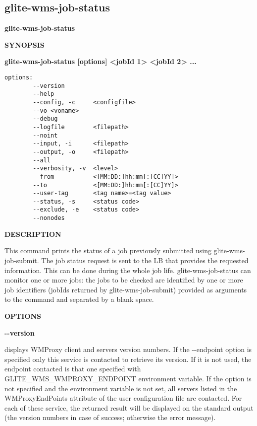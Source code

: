 
\subsection{glite-wms-job-status}
\label{glite-wms-job-status}

\medskip
\textbf{glite-wms-job-status}
\smallskip


\textbf{SYNOPSIS}
\smallskip

\textbf{glite-wms-job-status [options] <jobId 1> <jobId 2> ...}

\begin{verbatim}
options:
        --version
        --help
        --config, -c     <configfile>
        --vo <voname>
        --debug
        --logfile        <filepath>
        --noint
        --input, -i      <filepath>
        --output, -o     <filepath>
        --all
        --verbosity, -v  <level>
        --from           <[MM:DD:]hh:mm[:[CC]YY]>
        --to             <[MM:DD:]hh:mm[:[CC]YY]>
        --user-tag       <tag name>=<tag value>
        --status, -s     <status code>
        --exclude, -e    <status code>
        --nonodes
\end{verbatim}

\medskip
\textbf{DESCRIPTION}
\smallskip

This command prints the status of a job previously submitted using glite-wms-job-submit.
The job status request is sent to the LB that provides the requested information.
This can be done during the whole job life.
glite-wms-job-status can monitor one or more jobs: the jobs to be checked are identified by one or more job 
identifiers (jobIds returned by glite-wms-job-submit) provided as arguments to the command and 
separated by a blank space.


\medskip\textbf{OPTIONS}\smallskip



\textbf{-{}-version}

displays WMProxy client and servers version numbers.
If the -{}-endpoint option is specified only this service is contacted to retrieve its version. If it is not used, the endpoint contacted is that one specified with GLITE\_WMS\_WMPROXY\_ENDPOINT environment variable. If the option is not specified and the environment variable is not set, all servers listed in the WMProxyEndPoints attribute of the user configuration file are contacted. For each of these service, the returned result will be displayed on the standard output (the version numbers in case of success; otherwise the error message).




